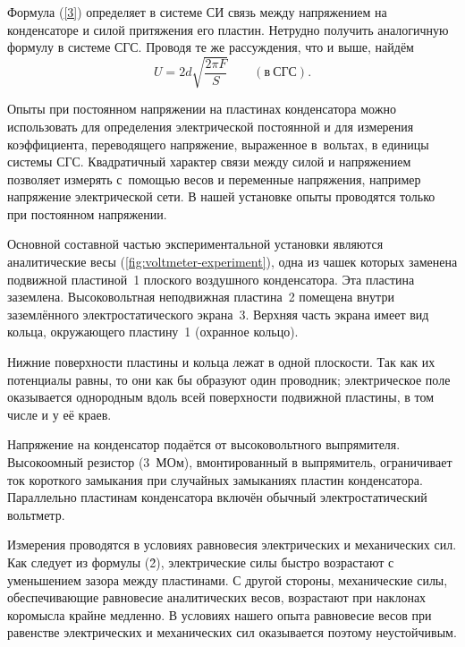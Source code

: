 Формула (\eqref{3}) определяет в системе СИ связь между напряжением на конденсаторе и силой притяжения его пластин. Нетрудно
получить аналогичную формулу в системе СГС. Проводя те же рассуждения, что и выше, найдём
\begin{equation}
	U=2d\sqrt{\frac{2\pi F}{S}}\qquad(в~СГС).
\end{equation}

Опыты при постоянном напряжении на пластинах конденсатора можно использовать для определения электрической постоянной и
для измерения коэффициента, переводящего напряжение, выраженное в~вольтах, в единицы системы СГС. Квадратичный характер
связи между силой и напряжением позволяет измерять с~помощью весов и переменные напряжения, например напряжение
электрической сети. В нашей установке опыты проводятся только при постоянном напряжении.


\experiment Основной составной частью экспериментальной установки являются аналитические весы (\ref{fig:voltmeter-experiment}), одна из чашек которых
заменена подвижной пластиной~1 плоского воздушного конденсатора. Эта пластина заземлена. Высоковольтная неподвижная
пластина~2 помещена внутри заземлённого электростатического экрана~3. Верхняя часть экрана имеет вид кольца, окружающего
пластину~1 (охранное кольцо).

Нижние поверхности пластины и кольца лежат в одной плоскости. Так как их потенциалы равны, то они как бы образуют один
проводник; электрическое поле оказывается однородным вдоль всей поверхности подвижной пластины, в том числе и у её краев.

Напряжение на конденсатор подаётся от высоковольтного выпрямителя. Высокоомный резистор (3~МОм), вмонтированный в
выпрямитель, ограничивает ток короткого замыкания при случайных замыканиях пластин конденсатора. Параллельно пластинам
конденсатора включён обычный электростатический вольтметр.


Измерения проводятся в условиях равновесия электрических и механических сил. Как следует из формулы (\r{2}),
электрические силы быстро возрастают с уменьшением зазора между пластинами. С другой стороны, механические силы,
обеспечивающие равновесие аналитических весов, возрастают при наклонах коромысла крайне медленно. В условиях нашего
опыта равновесие весов при равенстве электрических и механических сил оказывается поэтому неустойчивым.

